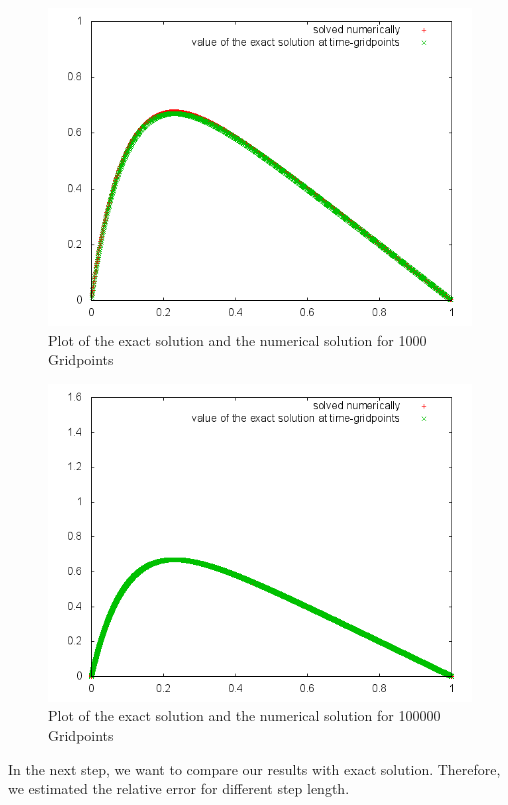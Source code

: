 \documentclass[10pt,a4paper]{article}
\begin{document}
\begin{figure}[h]
\centering
\includegraphics[scale=0.5]{Comparisonplot1000.png}
\caption{Plot of the exact solution and the numerical solution for 1000 Gridpoints}
\label{Comparison1000}
\end{figure}

\begin{figure}[h]
\centering
\includegraphics[scale=0.5]{Comparisonplot100000.png}
\caption{Plot of the exact solution and the numerical solution for 100000 Gridpoints}
\label{Comparison100000}
\end{figure}

In the next step, we want to compare our results with exact solution. Therefore, we estimated the relative error for different step length. 
\end{document}
